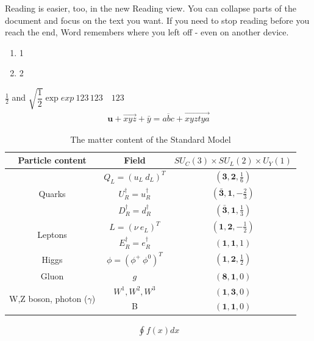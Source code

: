 \documentclass[a4paper, 11pt]{article}
\begin{document}
	Reading is easier, too, in the new Reading view. You can collapse parts of the document and focus on the text you want. If you need to stop reading before you reach the end, Word remembers where you left off - even on another device.
	\begin{enumerate}
		\item 1
		\item 2
	\end{enumerate}
	$ \frac{1}{2} $ and $ \sqrt{\dfrac{1}{2}} \exp                  exp \ 123 \,123\quad123 $
	\begin{align}
	\textbf{u}+\vec{xyz}+\bar{y}=\overline{abc} + \overrightarrow{xyztya}
	\end{align}
	\renewcommand{\arraystretch}{1.2}
\begin{table}
	\begin{center}
		\begin{tabular}{|c|c|c|}
			\hline
			Particle content & Field & $ SU_C (3) \times SU_L (2) \times U_Y (1) $\\
			\hline\hline
			\multirow{3}{*}{Quarks} &$ Q_L = (u_L\ d_L)^T $ & $ (\textbf{3}, \textbf{2}, \frac{1}{6}) $\\
			& $ U^\dagger_R = u_R^\dagger $ & $ (\bar{\textbf{3}}, \textbf{1},-\frac{2}{3}) $\\
			& $ D^\dagger_R = d_R^\dagger $ & $ (\bar{\textbf{3}},\textbf{1},\frac{1}{3}) $\\
			\hline
			\multirow{2}{*}{Leptons} & $ L = (\nu\ e_L)^T $ & $ (\textbf{1}, \textbf{2}, - \frac{1}{2}) $\\
			& $ E^\dagger_R = e_R^\dagger $ & $ (\textbf{1}, \textbf{1},1) $\\
			\hline
			Higgs & $ \phi = (\phi^+\ \phi^0)^T $ & $ (\textbf{1}, \textbf{2},  \frac{1}{2}) $\\
			\hline
			Gluon & $ g $ & $ (\textbf{8}, \textbf{1}, 0) $\\
			\hline
			\multirow{2}{*}{W,Z boson, photon ($ \gamma $)} & $ W^1, W^2, W^3 $ & $ (\textbf{1}, \textbf{3}, 0) $\\
			& B & $ (\textbf{1}, \textbf{1}, 0) $\\
			\hline
		\end{tabular}
	\end{center}
	\caption{The matter content of the Standard Model}
	\label{SM particle}
\end{table}
	\renewcommand{\arraystretch}{1}
	\begin{align}
	\oint f\left(x\right)dx
	\end{align}
\end{document}
